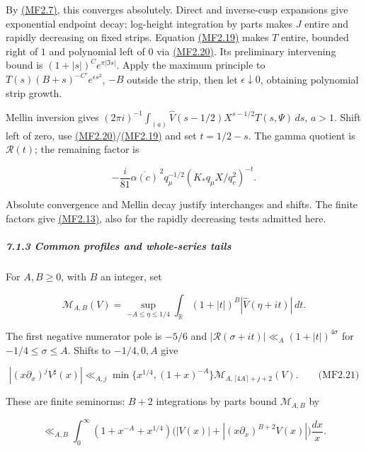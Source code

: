 By \protect\hyperlink{mf:eq:B2.7}{(MF2.7)}, this converges absolutely. Direct and inverse-cusp expansions give exponential endpoint decay; log-height integration by parts makes \(J\) entire and rapidly decreasing on fixed strips. Equation \protect\hyperlink{mf:eq:B2.19}{(MF2.19)} makes \(T\) entire, bounded right of \(1\) and polynomial left of \(0\) via \protect\hyperlink{mf:eq:B2.20}{(MF2.20)}. Its preliminary intervening bound is \((1+|s|)^C e^{\pi|\Im s|}\). Apply the maximum principle to \(T(s)(B+s)^{-C'}e^{\epsilon s^2}\), \(-B\) outside the strip, then let \(\epsilon\downarrow0\), obtaining polynomial strip growth.

Mellin inversion gives \((2\pi i)^{-1}\int_{(a)}\widehat V(s-1/2)X^{s-1/2}T(s,\Psi)\,ds\), \(a>1\). Shift left of zero, use \protect\hyperlink{mf:eq:B2.20}{(MF2.20)}/\protect\hyperlink{mf:eq:B2.19}{(MF2.19)} and set \(t=1/2-s\). The gamma quotient is \(\mathcal R(t)\); the remaining factor is

\[
-\frac i{81}\overline{\alpha(c)}^{\,2}q_\mu^{-1/2}
(K_*q_\mu X/q_c^2)^{-t}.
\]

Absolute convergence and Mellin decay justify interchanges and shifts. The finite factors give \protect\hyperlink{mf:eq:B2.13}{(MF2.13)}, also for the rapidly decreasing tests admitted here.

\hypertarget{common-profiles-and-whole-series-tails}{}

\label{common-profiles-and-whole-series-tails}

\hypertarget{common-profiles-and-whole-series-tails-heading-2}{%
\subparagraph{7.1.3 Common profiles and whole-series tails}}

For \(A,B\ge0\), with \(B\) an integer, set

\[
\mathcal M_{A,B}(V)=
\sup_{-A\le\eta\le1/4}\int_{\mathbb R}
(1+|t|)^B|\widehat V(\eta+it)|\,dt.
\]

The first negative numerator pole is \(-5/6\) and \(|\mathcal R(\sigma+it)|\ll_A(1+|t|)^{4\sigma}\) for \(-1/4\le\sigma\le A\). Shifts to \(-1/4,0,A\) give

\hypertarget{mf:eq:B2.21}{}

\label{mf:eq:B2.21}

\[
|(x\partial_x)^jV^\sharp(x)|
\ll_{A,j}\min\{x^{1/4},(1+x)^{-A}\}
\mathcal M_{A,\lceil4A\rceil+j+2}(V).
\qquad\text{(MF2.21)}
\]

These are finite seminorms: \(B+2\) integrations by parts bound \(\mathcal M_{A,B}\) by

\[
\ll_{A,B}\int_0^\infty
(1+x^{-A}+x^{1/4})\bigl(|V(x)|+|(x\partial_x)^{B+2}V(x)|\bigr)\frac{dx}{x}.
\]

